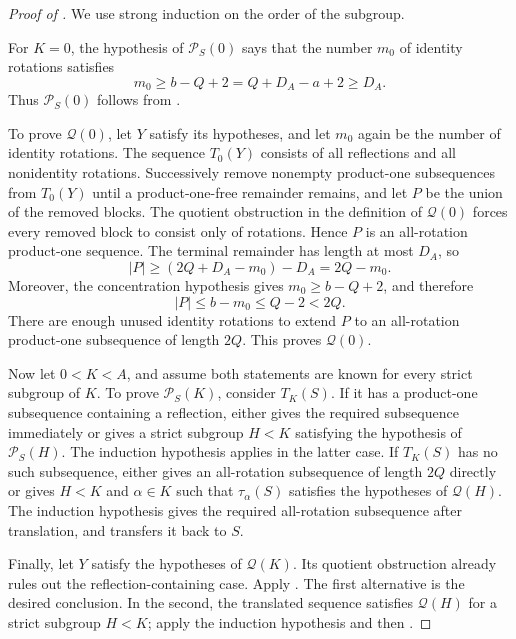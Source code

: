 \begin{proof}[Proof of ]
We use strong induction on the order of the subgroup.

For \(K=0\), the hypothesis of \(\mathcal P_S(0)\) says that the
number \(m_0\) of identity rotations satisfies
\[
  m_0\ge b-Q+2=Q+D_A-a+2\ge D_A.
\]
Thus \(\mathcal P_S(0)\) follows from
.

To prove \(\mathcal Q(0)\), let \(Y\) satisfy its hypotheses, and let
\(m_0\) again be the number of identity rotations. The sequence
\(T_0(Y)\) consists of all reflections and all nonidentity rotations.
Successively remove nonempty product-one subsequences from \(T_0(Y)\)
until a product-one-free remainder remains, and let \(P\) be the union
of the removed blocks. The quotient obstruction in the definition of
\(\mathcal Q(0)\) forces every removed block to consist only of
rotations. Hence \(P\) is an all-rotation product-one sequence. The
terminal remainder has length at most \(D_A\), so
\[
  |P|\ge (2Q+D_A-m_0)-D_A=2Q-m_0.
\]
Moreover, the concentration hypothesis gives
\(m_0\ge b-Q+2\), and therefore
\[
  |P|\le b-m_0\le Q-2<2Q.
\]
There are enough unused identity rotations to extend \(P\) to an
all-rotation product-one subsequence of length \(2Q\). This proves
\(\mathcal Q(0)\).

Now let \(0<K<A\), and assume both statements are known for every
strict subgroup of \(K\). To prove \(\mathcal P_S(K)\), consider
\(T_K(S)\). If it has a product-one subsequence containing a reflection,
 either gives the required subsequence
immediately or gives a strict subgroup \(H<K\) satisfying the hypothesis
of \(\mathcal P_S(H)\). The induction hypothesis applies in the latter
case. If \(T_K(S)\) has no such subsequence,
 either gives an all-rotation subsequence of
length \(2Q\) directly or gives \(H<K\) and \(\alpha\in K\) such that
\(\tau_\alpha(S)\) satisfies the hypotheses of \(\mathcal Q(H)\). The
induction hypothesis gives the required all-rotation subsequence after
translation, and  transfers it back to
\(S\).

Finally, let \(Y\) satisfy the hypotheses of \(\mathcal Q(K)\). Its
quotient obstruction already rules out the reflection-containing case.
Apply . The first alternative is the desired
conclusion. In the second, the translated sequence satisfies
\(\mathcal Q(H)\) for a strict subgroup \(H<K\); apply the induction
hypothesis and then .
\end{proof}
